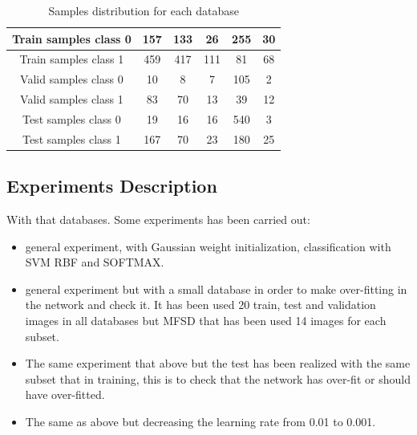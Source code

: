 \begin{table}[]
\begin{tabular}{c|c|c|c|c|c|}
\multicolumn{1}{|c|}{\cellcolor[HTML]{ECF4FF}Train samples class 0} & 157                              & 133                                    & 26                                   & 255                                  & 30                           \\ \hline
\multicolumn{1}{|c|}{\cellcolor[HTML]{ECF4FF}Train samples class 1} & 459                              & 417                                    & 111                                  & 81                                   & 68                           \\ \hline
\multicolumn{1}{|c|}{\cellcolor[HTML]{ECF4FF}Valid samples class 0} & 10                               & 8                                      & 7                                    & 105                                  & 2                            \\ \hline
\multicolumn{1}{|c|}{\cellcolor[HTML]{ECF4FF}Valid samples class 1} & 83                               & 70                                     & 13                                   & 39                                   & 12                           \\ \hline
\multicolumn{1}{|c|}{\cellcolor[HTML]{ECF4FF}Test samples class 0}  & 19                               & 16                                     & 16                                   & 540                                  & 3                            \\ \hline
\multicolumn{1}{|c|}{\cellcolor[HTML]{ECF4FF}Test samples class 1}  & 167                              & 70                                     & 23                                   & 180                                  & 25                           \\ \hline
\end{tabular}\caption{Samples distribution for each database}
\label{Samples_distribution}
\end{table}

\subsection{Experiments Description}
With that databases. Some experiments has been carried out:

\begin{itemize}
\item general experiment, with Gaussian weight initialization, classification with SVM RBF and SOFTMAX.
\item general experiment but with a small database in order to make over-fitting in the network and check it. It has been used 20 train, test and validation images in all databases but MFSD that has been used 14 images for each subset.
\item The same experiment that above but the test has been realized with the same subset that in training, this is to check that the network has over-fit or should have over-fitted.
\item The same as above but decreasing the learning rate from 0.01 to 0.001. \\
\end{itemize}


